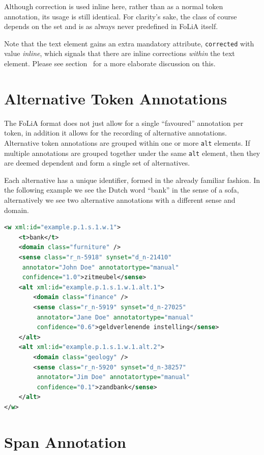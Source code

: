 \documentclass[a4paper,12pt]{report}
\begin{document}
Although correction is used inline here, rather than as a normal token annotation, its usage is still identical. For clarity's sake, the class of course depends on the set and is as always never predefined in FoLiA itself.

Note that the text element gains an extra mandatory attribute, \texttt{corrected} with value \emph{inline}, which signals that there are inline corrections \emph{within} the text element. Please see section~\label{sec:textcontent} for a more elaborate discussion on this.


\section{Alternative Token Annotations}
\label{sec:alternatives}

The FoLiA format does not just allow for a single ``favoured'' annotation per token, in addition it allows for the recording of alternative annotations. Alternative token annotations are grouped within one or more \texttt{alt} elements. If multiple annotations are grouped together under the same \texttt{alt} element, then they are deemed dependent and form a single set of alternatives.

Each alternative has a unique identifier, formed in the already familiar fashion. In the following example we see the Dutch word ``bank'' in the sense of a sofa, alternatively we see two alternative annotations with a different sense and domain.

\begin{lstlisting}[language=xml]
<w xml:id="example.p.1.s.1.w.1">
    <t>bank</t>
    <domain class="furniture" />
    <sense class="r_n-5918" synset="d_n-21410" 
     annotator="John Doe" annotatortype="manual" 
     confidence="1.0">zitmeubel</sense>
    <alt xml:id="example.p.1.s.1.w.1.alt.1">
        <domain class="finance" />
        <sense class="r_n-5919" synset="d_n-27025"
         annotator="Jane Doe" annotatortype="manual" 
         confidence="0.6">geldverlenende instelling</sense>        
    </alt>
    <alt xml:id="example.p.1.s.1.w.1.alt.2">
        <domain class="geology" />
        <sense class="r_n-5920" synset="d_n-38257"
         annotator="Jim Doe" annotatortype="manual"
         confidence="0.1">zandbank</sense>        
    </alt>    
</w>
\end{lstlisting}


\section{Span Annotation}
\end{document}
